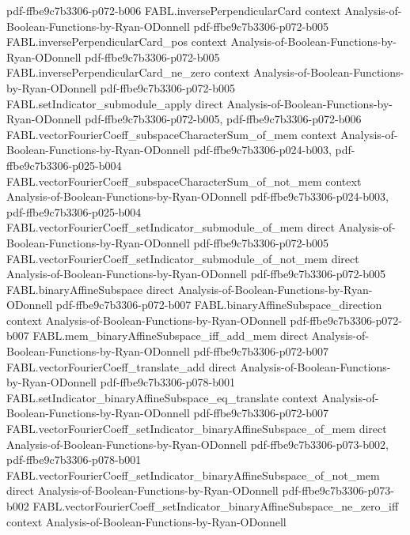 \begin{theorem}
{    pdf-ffbe9c7b3306-p072-b006}
\proofstep
  {FABL.inversePerpendicularCard}
  {context}
  {Analysis-of-Boolean-Functions-by-Ryan-ODonnell}
  {pdf-ffbe9c7b3306-p072-b005}
\proofstep
  {FABL.inversePerpendicularCard_pos}
  {context}
  {Analysis-of-Boolean-Functions-by-Ryan-ODonnell}
  {pdf-ffbe9c7b3306-p072-b005}
\proofstep
  {FABL.inversePerpendicularCard_ne_zero}
  {context}
  {Analysis-of-Boolean-Functions-by-Ryan-ODonnell}
  {pdf-ffbe9c7b3306-p072-b005}
\proofstep
  {FABL.setIndicator_submodule_apply}
  {direct}
  {Analysis-of-Boolean-Functions-by-Ryan-ODonnell}
  {pdf-ffbe9c7b3306-p072-b005,
    pdf-ffbe9c7b3306-p072-b006}
\proofstep
  {FABL.vectorFourierCoeff_subspaceCharacterSum_of_mem}
  {context}
  {Analysis-of-Boolean-Functions-by-Ryan-ODonnell}
  {pdf-ffbe9c7b3306-p024-b003,
    pdf-ffbe9c7b3306-p025-b004}
\proofstep
  {FABL.vectorFourierCoeff_subspaceCharacterSum_of_not_mem}
  {context}
  {Analysis-of-Boolean-Functions-by-Ryan-ODonnell}
  {pdf-ffbe9c7b3306-p024-b003,
    pdf-ffbe9c7b3306-p025-b004}
\proofstep
  {FABL.vectorFourierCoeff_setIndicator_submodule_of_mem}
  {direct}
  {Analysis-of-Boolean-Functions-by-Ryan-ODonnell}
  {pdf-ffbe9c7b3306-p072-b005}
\proofstep
  {FABL.vectorFourierCoeff_setIndicator_submodule_of_not_mem}
  {direct}
  {Analysis-of-Boolean-Functions-by-Ryan-ODonnell}
  {pdf-ffbe9c7b3306-p072-b005}
\proofstep
  {FABL.binaryAffineSubspace}
  {direct}
  {Analysis-of-Boolean-Functions-by-Ryan-ODonnell}
  {pdf-ffbe9c7b3306-p072-b007}
\proofstep
  {FABL.binaryAffineSubspace_direction}
  {context}
  {Analysis-of-Boolean-Functions-by-Ryan-ODonnell}
  {pdf-ffbe9c7b3306-p072-b007}
\proofstep
  {FABL.mem_binaryAffineSubspace_iff_add_mem}
  {direct}
  {Analysis-of-Boolean-Functions-by-Ryan-ODonnell}
  {pdf-ffbe9c7b3306-p072-b007}
\proofstep
  {FABL.vectorFourierCoeff_translate_add}
  {direct}
  {Analysis-of-Boolean-Functions-by-Ryan-ODonnell}
  {pdf-ffbe9c7b3306-p078-b001}
\proofstep
  {FABL.setIndicator_binaryAffineSubspace_eq_translate}
  {context}
  {Analysis-of-Boolean-Functions-by-Ryan-ODonnell}
  {pdf-ffbe9c7b3306-p072-b007}
\proofstep
  {FABL.vectorFourierCoeff_setIndicator_binaryAffineSubspace_of_mem}
  {direct}
  {Analysis-of-Boolean-Functions-by-Ryan-ODonnell}
  {pdf-ffbe9c7b3306-p073-b002,
    pdf-ffbe9c7b3306-p078-b001}
\proofstep
  {FABL.vectorFourierCoeff_setIndicator_binaryAffineSubspace_of_not_mem}
  {direct}
  {Analysis-of-Boolean-Functions-by-Ryan-ODonnell}
  {pdf-ffbe9c7b3306-p073-b002}
\proofstep
  {FABL.vectorFourierCoeff_setIndicator_binaryAffineSubspace_ne_zero_iff}
  {context}
  {Analysis-of-Boolean-Functions-by-Ryan-ODonnell}

\end{theorem}
